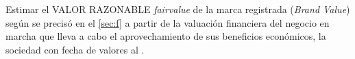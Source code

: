Estimar el \textcolor{principal}{VALOR RAZONABLE} \textit{\gls{fairvalue}} de la marca registrada \textcolor{principal}{\marca{}} (\textit{Brand Value}) seg\'un se precis\'o en el \autoref{sec:f} a partir de la valuaci\'on financiera del negocio en marcha que lleva a cabo el aprovechamiento de sus beneficios econ\'omicos, la sociedad \textcolor{principal}{\empresaSolicitante} con fecha de valores al \textcolor{principal}{\fechaValores}.

